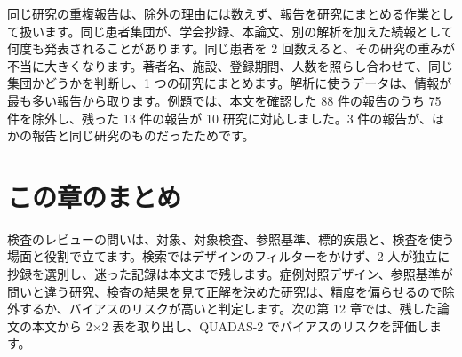 同じ研究の重複報告は、除外の理由には数えず、報告を研究にまとめる作業として扱います。同じ患者集団が、学会抄録、本論文、別の解析を加えた続報として何度も発表されることがあります。同じ患者を 2 回数えると、その研究の重みが不当に大きくなります。著者名、施設、登録期間、人数を照らし合わせて、同じ集団かどうかを判断し、1 つの研究にまとめます。解析に使うデータは、情報が最も多い報告から取ります。例題では、本文を確認した 88 件の報告のうち 75 件を除外し、残った 13 件の報告が 10 研究に対応しました。3 件の報告が、ほかの報告と同じ研究のものだったためです。

\section{この章のまとめ}
\label{sec:11-7}

検査のレビューの問いは、対象、対象検査、参照基準、標的疾患と、検査を使う場面と役割で立てます。検索ではデザインのフィルターをかけず、2 人が独立に抄録を選別し、迷った記録は本文まで残します。症例対照デザイン、参照基準が問いと違う研究、検査の結果を見て正解を決めた研究は、精度を偏らせるので除外するか、バイアスのリスクが高いと判定します。次の第 12 章では、残した論文の本文から 2×2 表を取り出し、QUADAS-2 でバイアスのリスクを評価します。
